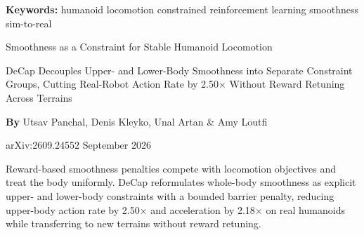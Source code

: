 \documentclass[10pt,twocolumn]{article}
\begin{document}
\setlength{\parindent}{0pt}
\setlength{\parskip}{4pt}

{\small\color{keywordgray}\textbf{Keywords:}
  humanoid locomotion \textbullet{}
  constrained reinforcement learning \textbullet{}
  smoothness \textbullet{}
  sim-to-real}\par\vspace{4pt}

{\LARGE\bfseries\raggedright
  Smoothness as a Constraint for Stable
  Humanoid Locomotion}\par\vspace{4pt}

{\large\itshape\raggedright
  DeCap Decouples Upper- and Lower-Body Smoothness into Separate
  Constraint Groups, Cutting Real-Robot Action Rate by 2.50$\times$
  Without Reward Retuning Across Terrains}\par\vspace{6pt}

{\small\textbf{By} Utsav Panchal, Denis Kleyko, Unal Artan \&
  Amy Loutfi}\par\vspace{2pt}

{\small\color{keywordgray}arXiv:2609.24552 \textbullet{} September 2026}
\par\vspace{2pt}\noindent{\color{rulered}\rule{\columnwidth}{0.6pt}}\vspace{6pt}

Reward-based smoothness penalties compete with locomotion objectives and
treat the body uniformly. DeCap reformulates whole-body smoothness as
explicit upper- and lower-body constraints with a bounded barrier penalty,
reducing upper-body action rate by 2.50$\times$ and acceleration by
2.18$\times$ on real humanoids while transferring to new terrains without
reward retuning.
\end{document}
